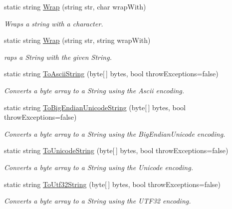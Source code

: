 \begin{DoxyCompactItemize}
static string \hyperlink{class_ultimate_1_1_utilities_1_1_string_utils_a168db7c98b834b2da6eb107745d6d944}{Wrap} (string str, char wrap\+With)
\begin{DoxyCompactList}\small\item\em Wraps a string with a character. \end{DoxyCompactList}\item 
static string \hyperlink{class_ultimate_1_1_utilities_1_1_string_utils_a7423ababd313ced3c41a6b151599fe2b}{Wrap} (string str, string wrap\+With)
\begin{DoxyCompactList}\small\item\em raps a String with the given String. \end{DoxyCompactList}\item 
static string \hyperlink{class_ultimate_1_1_utilities_1_1_string_utils_a997e694474831e5aeef8b09b791f9688}{To\+Ascii\+String} (byte\mbox{[}$\,$\mbox{]} bytes, bool throw\+Exceptions=false)
\begin{DoxyCompactList}\small\item\em Converts a byte array to a String using the Ascii encoding. \end{DoxyCompactList}\item 
static string \hyperlink{class_ultimate_1_1_utilities_1_1_string_utils_aae78261c53c282f80ff3fdc6d236ebe2}{To\+Big\+Endian\+Unicode\+String} (byte\mbox{[}$\,$\mbox{]} bytes, bool throw\+Exceptions=false)
\begin{DoxyCompactList}\small\item\em Converts a byte array to a String using the Big\+Endian\+Unicode encoding. \end{DoxyCompactList}\item 
static string \hyperlink{class_ultimate_1_1_utilities_1_1_string_utils_aeb4791688e8ba12a06af2ddfcf8ad82a}{To\+Unicode\+String} (byte\mbox{[}$\,$\mbox{]} bytes, bool throw\+Exceptions=false)
\begin{DoxyCompactList}\small\item\em Converts a byte array to a String using the Unicode encoding. \end{DoxyCompactList}\item 
static string \hyperlink{class_ultimate_1_1_utilities_1_1_string_utils_a838a640e4f7fc5f4420cbc170ad4ddb6}{To\+Utf32\+String} (byte\mbox{[}$\,$\mbox{]} bytes, bool throw\+Exceptions=false)
\begin{DoxyCompactList}\small\item\em Converts a byte array to a String using the U\+T\+F32 encoding. \end{DoxyCompactList}\item 

\end{DoxyCompactItemize}
